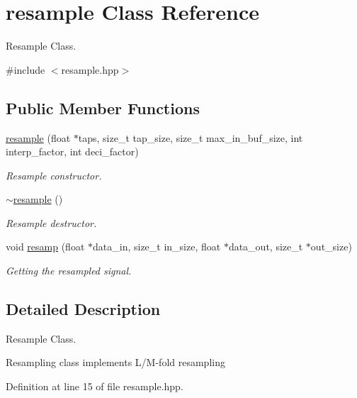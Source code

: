 \hypertarget{classresample}{}\section{resample Class Reference}
\label{classresample}


Resample Class.  




{\ttfamily \#include $<$resample.\+hpp$>$}

\subsection*{Public Member Functions}
\begin{DoxyCompactItemize}
\item 
\hyperlink{classresample_af9ae60e50b2be5ee96f8f2bddf942b90}{resample} (float $\ast$taps, size\+\_\+t tap\+\_\+size, size\+\_\+t max\+\_\+in\+\_\+buf\+\_\+size, int interp\+\_\+factor, int deci\+\_\+factor)
\begin{DoxyCompactList}\small\item\em Resample constructor. \end{DoxyCompactList}\item 
\mbox{\label{classresample_a98884fd6264cbd4c7254e7c3767b5a85}} 
\hyperlink{classresample_a98884fd6264cbd4c7254e7c3767b5a85}{$\sim$resample} ()
\begin{DoxyCompactList}\small\item\em Resample destructor. \end{DoxyCompactList}\item 
void \hyperlink{classresample_a121c622a3ed64b69b09025a008f84dc3}{resamp} (float $\ast$data\+\_\+in, size\+\_\+t in\+\_\+size, float $\ast$data\+\_\+out, size\+\_\+t $\ast$out\+\_\+size)
\begin{DoxyCompactList}\small\item\em Getting the resampled signal. \end{DoxyCompactList}\end{DoxyCompactItemize}


\subsection{Detailed Description}
Resample Class. 

Resampling class implements L/\+M-\/fold resampling 

Definition at line 15 of file resample.\+hpp.



